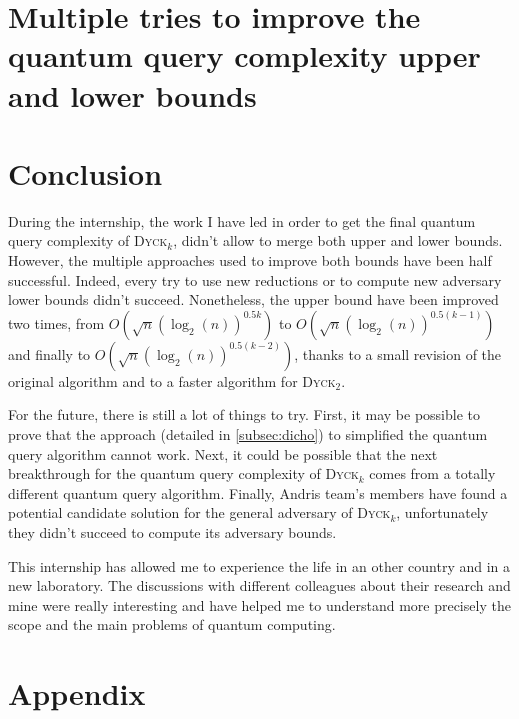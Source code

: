 \documentclass[11pt,a4paper]{article}
\newcommand{\Dyck}[1]{\textsc{Dyck$_{#1}$}}
\theoremstyle{definition}
\theoremstyle{plain}
\theoremstyle{definition}
\begin{document}
\section{Multiple tries to improve the quantum query complexity upper and lower bounds}
\label{tries_section}



\section{Conclusion}

During the internship, the work I have led  in order to get the
final quantum query complexity of \Dyck{k}, didn't allow to merge
both  upper and lower bounds. However, the multiple approaches used
to improve both bounds have been half successful. Indeed, every
try to use new reductions or to compute new adversary lower bounds
didn't succeed. Nonetheless, the upper bound have been improved
two times, from $O(\sqrt{n}(\log_2(n))^{0.5k})$ to
$O(\sqrt{n}(\log_2(n))^{0.5(k-1)})$ and finally to
$O(\sqrt{n}(\log_2(n))^{0.5(k-2)})$, thanks to a small revision
of the original algorithm and to a faster algorithm for \Dyck{2}.

For the future, there is still a lot of things to try. First,
it may be possible to prove that the approach (detailed in
\autoref{subsec:dicho}) to simplified the quantum query algorithm
cannot work. Next, it could be possible that the next breakthrough
for the quantum query complexity of \Dyck{k} comes from a totally
different quantum query algorithm. Finally, Andris team's members
have found a potential candidate solution for the general adversary
of \Dyck{k}, unfortunately they didn't succeed to compute its adversary
bounds.

This internship has allowed me to experience the life in an other
country and in a new laboratory. The discussions with different
colleagues about their research and mine were really interesting
and have helped me to understand more precisely the scope and the main
problems of quantum computing.







\newpage

\section{Appendix}

\listoffigures
\listofalgorithms


\end{document}
